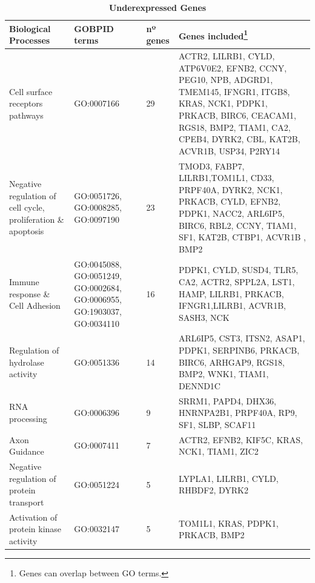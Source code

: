 \documentclass[9pt,twocolumn,twoside]{gsajnl}
\begin{document}
\begin{table}[htbp]
\centering
\caption{\bf Underexpressed Genes}
\begin{tableminipage}{\textwidth}
\begin{tabularx}{\textwidth}{m{3cm}m{3.5cm}m{1.2cm}m{9.2cm}}
\hline
Biological Processes & GOBPID terms & nº genes & Genes included\footnote{Genes can overlap between GO terms.} \\
\hline

Cell surface receptors pathways & GO:0007166 & 29 & ACTR2, LILRB1, CYLD, ATP6V0E2, EFNB2, CCNY, PEG10, NPB, ADGRD1, TMEM145, IFNGR1, ITGB8, KRAS, NCK1, PDPK1, PRKACB, BIRC6, CEACAM1, RGS18, BMP2, TIAM1, CA2, CPEB4, DYRK2, CBL, KAT2B, ACVR1B, USP34, P2RY14\\

Negative regulation of cell cycle, proliferation \& apoptosis& GO:0051726, GO:0008285, GO:0097190 & 23 & TMOD3, FABP7, LILRB1,TOM1L1, CD33, PRPF40A, DYRK2, NCK1, PRKACB, CYLD, EFNB2, PDPK1, NACC2, ARL6IP5, BIRC6, RBL2, CCNY, TIAM1, SF1, KAT2B, CTBP1, ACVR1B , BMP2\\

Immune response \& Cell Adhesion & GO:0045088, GO:0051249, GO:0002684, GO:0006955, GO:1903037, GO:0034110  & 16 & PDPK1, CYLD, SUSD4, TLR5, CA2, ACTR2, SPPL2A, LST1, HAMP, LILRB1, PRKACB, IFNGR1,LILRB1, ACVR1B, SASH3, NCK\\

Regulation of hydrolase activity & GO:0051336 & 14 & ARL6IP5, CST3, ITSN2, ASAP1, PDPK1, SERPINB6, PRKACB, BIRC6, ARHGAP9, RGS18, BMP2, WNK1, TIAM1, DENND1C\\ 

RNA processing & GO:0006396 & 9 & SRRM1, PAPD4, DHX36, HNRNPA2B1, PRPF40A, RP9, SF1, SLBP, SCAF11\\

Axon Guidance & GO:0007411 & 7 & ACTR2, EFNB2, KIF5C, KRAS, NCK1, TIAM1, ZIC2\\

Negative regulation of protein transport & GO:0051224 & 5 & LYPLA1, LILRB1, CYLD, RHBDF2, DYRK2\\

Activation of protein kinase activity & GO:0032147 & 5 & TOM1L1, KRAS, PDPK1, PRKACB, BMP2\\
\hline
\end{tabularx}
  \label{tab:under}
\end{tableminipage}
\end{table}
\end{document}
